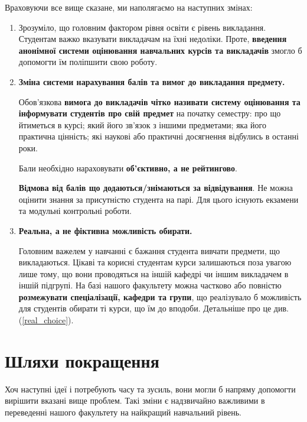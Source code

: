 \documentclass[14pt, a4paper]{extarticle}  %
\begin{document}
Враховуючи все вище сказане, ми наполягаємо на наступних змінах:
\begin{enumerate}
    \item  
    Зрозуміло, що головним фактором рівня освіти є рівень викладання. Студентам важко вказувати викладачам на їхні недоліки. Проте, \textbf{ введення анонімної системи оцінювання навчальних курсів та викладачів} змогло б допомогти їм поліпшити свою роботу. 
    
    \item  \textbf{Зміна системи нарахування балів та вимог до викладання предмету.}
    
    Обов'язкова \textbf{вимога до викладачів чітко називати систему оцінювання та інформувати студентів про свій предмет} на початку семестру: про що йтиметься в курсі; який його зв'язок з іншими предметами; яка його практична цінність; які наукові або практичні досягнення відбулись в останні роки.
    
    Бали необхідно нараховувати \textbf{об'єктивно, а не рейтингово}. 
    
    \textbf{Відмова від балів що додаються/знімаються за відвідування}. Не можна оцінити знання за присутністю студента на парі. Для цього існують екзамени та модульні контрольні роботи.
    
    \item \textbf{Реальна, а не фіктивна можливість обирати.} 
    
    Головним важелем у навчанні є бажання студента вивчати предмети, що викладаються. Цікаві та корисні студентам курси залишаються поза увагою лише тому, що вони проводяться на іншій кафедрі чи іншим викладачем в іншій підгрупі. На базі нашого факультету можна частково або повністю \textbf{розмежувати спеціалізації, кафедри та групи}, що реалізувало б можливість для студентів обирати ті курси, що їм до вподоби. Детальніше про це див. (\ref{real_choice}). 
\end{enumerate}

\newpage
\section{Шляхи покращення}

Хоч наступні ідеї і потребують часу та зусиль, вони могли б напряму допомогти  вирішити вказані вище проблем. Такі зміни є надзвичайно важливими в переведенні нашого факультету на найкращий навчальний рівень.    
\end{document}
